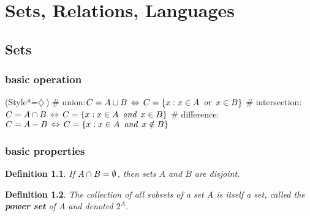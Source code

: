 \chapter{Sets, Relations, Languages}
\newtheorem{theorem_root}{\theorem}[chapter]
\newtheorem{example_root}{\example}[chapter]

\section{Sets}

\subsection{basic operation}
\begin{easylist}[checklist]
\ListProperties(Style*=$\diamondsuit\,$)
# union:\quad $C = A\union B\,\Leftrightarrow\, C = \{x: x\in A \oor x\in B\}$
# intersection:\quad $C = A\intersection B\,\Leftrightarrow\,C = \{x: x\in A\aand x\in B\}$
# difference:\quad $C = A - B\,\Leftrightarrow\,C = \{x: x\in A\aand x\notin B\}$
\end{easylist}

\subsection{basic properties}

\newtheorem{disjoint}[theorem_root]{Definition}
\begin{disjoint}
If $A\cap B = \emptyset$, then sets $A$ and $B$ are disjoint.
\end{disjoint}

\newtheorem{powerset}[theorem_root]{Definition}
\begin{powerset}
The collection of all subsets of a set A is itself a set, called the {\bf power set}
of A and denoted $2^A$.
\end{powerset}

